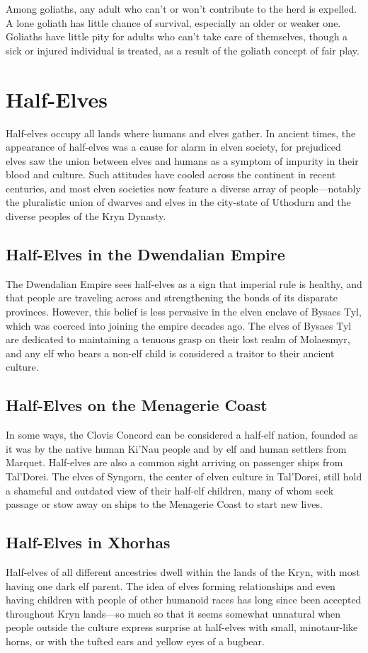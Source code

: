 \documentclass[10pt,a4paper,twoside,bg=print,twocolumn,openany,nodeprecatedcode]{dndbook}
\begin{document}
Among goliaths, any adult who can't or won't contribute to the herd is expelled. A lone goliath has little chance of survival, especially an older or weaker one. Goliaths have little pity for adults who can't take care of themselves, though a sick or injured individual is treated, as a result of the goliath concept of fair play.

\section{Half-Elves}
Half-elves occupy all lands where humans and elves gather. In ancient times, the appearance of half-elves was a cause for alarm in elven society, for prejudiced elves saw the union between elves and humans as a symptom of impurity in their blood and culture. Such attitudes have cooled across the continent in recent centuries, and most elven societies now feature a diverse array of people—notably the pluralistic union of dwarves and elves in the city-state of Uthodurn and the diverse peoples of the Kryn Dynasty.

\subsection{Half-Elves in the Dwendalian Empire}
The Dwendalian Empire sees half-elves as a sign that imperial rule is healthy, and that people are traveling across and strengthening the bonds of its disparate provinces. However, this belief is less pervasive in the elven enclave of Bysaes Tyl, which was coerced into joining the empire decades ago. The elves of Bysaes Tyl are dedicated to maintaining a tenuous grasp on their lost realm of Molaesmyr, and any elf who bears a non-elf child is considered a traitor to their ancient culture.

\subsection{Half-Elves on the Menagerie Coast}
In some ways, the Clovis Concord can be considered a half-elf nation, founded as it was by the native human Ki'Nau people and by elf and human settlers from Marquet. Half-elves are also a common sight arriving on passenger ships from Tal'Dorei. The elves of Syngorn, the center of elven culture in Tal'Dorei, still hold a shameful and outdated view of their half-elf children, many of whom seek passage or stow away on ships to the Menagerie Coast to start new lives.

\subsection{Half-Elves in Xhorhas}
Half-elves of all different ancestries dwell within the lands of the Kryn, with most having one dark elf parent. The idea of elves forming relationships and even having children with people of other humanoid races has long since been accepted throughout Kryn lands—so much so that it seems somewhat unnatural when people outside the culture express surprise at half-elves with small, minotaur-like horns, or with the tufted ears and yellow eyes of a bugbear.
\end{document}
